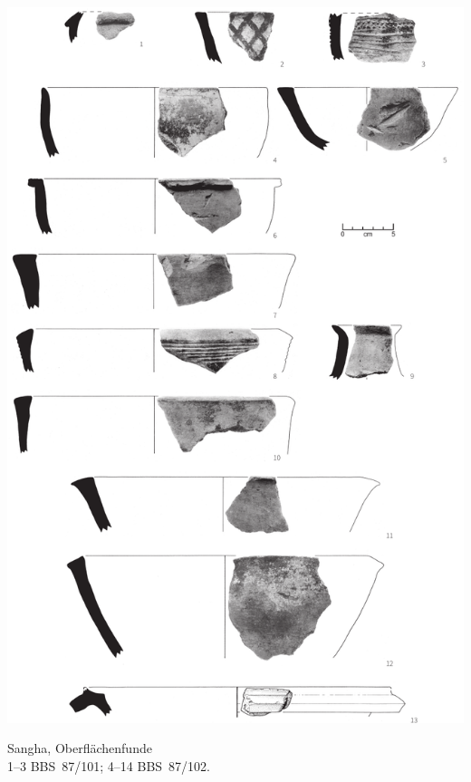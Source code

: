 \begin{pl}[H]
	\includegraphics{plt/Taf34.pdf}
	\vspace{.75em}\caption{\mbox{Sangha}, Oberflächenfunde \\ 1--3 BBS~87/101; 4--14 BBS~87/102.}
	\label{pl:34}
\end{pl}

